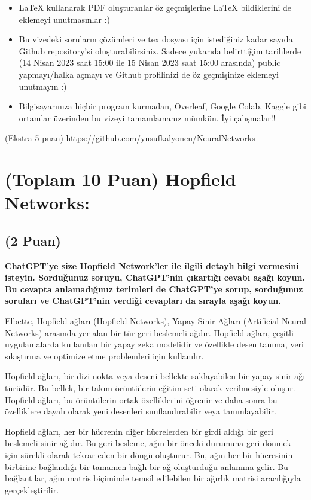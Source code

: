 \documentclass[11pt]{article}
\begin{document}
\begin{itemize}
    \item LaTeX kullanarak PDF oluşturanlar öz geçmişlerine LaTeX bildiklerini de eklemeyi unutmasınlar :)
    \item Bu vizedeki soruların çözümleri ve tex dosyası için istediğiniz kadar sayıda Github repository'si oluşturabilirsiniz. Sadece yukarıda belirttiğim tarihlerde (14 Nisan 2023 saat 15:00 ile 15 Nisan 2023 saat 15:00 arasında) public yapmayı/halka açmayı ve Github profilinizi de öz geçmişinize eklemeyi unutmayın :)
    \item Bilgisayarınıza hiçbir program kurmadan, Overleaf, Google Colab, Kaggle gibi ortamlar üzerinden bu vizeyi tamamlamanız mümkün. İyi çalışmalar!!
\end{itemize}

(Ekstra 5 puan) \url{https://github.com/yusufkalyoncu/NeuralNetworks}

\newpage
\section{(Toplam 10 Puan) Hopfield Networks:}

\subsection{(2 Puan)} \textbf{ChatGPT’ye size Hopfield Network’ler ile ilgili detaylı bilgi vermesini isteyin. Sorduğunuz soruyu, ChatGPT'nin çıkartığı cevabı aşağı koyun. Bu cevapta anlamadığınız terimleri de ChatGPT’ye sorup, sorduğunuz soruları ve ChatGPT’nin verdiği cevapları da sırayla aşağı koyun.}

Elbette, Hopfield ağları (Hopfield Networks), Yapay Sinir Ağları (Artificial Neural Networks) arasında yer alan bir tür geri beslemeli ağdır. Hopfield ağları, çeşitli uygulamalarda kullanılan bir yapay zeka modelidir ve özellikle desen tanıma, veri sıkıştırma ve optimize etme problemleri için kullanılır.

Hopfield ağları, bir dizi nokta veya deseni bellekte saklayabilen bir yapay sinir ağı türüdür. Bu bellek, bir takım örüntülerin eğitim seti olarak verilmesiyle oluşur. Hopfield ağları, bu örüntülerin ortak özelliklerini öğrenir ve daha sonra bu özelliklere dayalı olarak yeni desenleri sınıflandırabilir veya tanımlayabilir.

Hopfield ağları, her bir hücrenin diğer hücrelerden bir girdi aldığı bir geri beslemeli sinir ağıdır. Bu geri besleme, ağın bir önceki durumuna geri dönmek için sürekli olarak tekrar eden bir döngü oluşturur. Bu, ağın her bir hücresinin birbirine bağlandığı bir tamamen bağlı bir ağ oluşturduğu anlamına gelir. Bu bağlantılar, ağın matris biçiminde temsil edilebilen bir ağırlık matrisi aracılığıyla gerçekleştirilir.
\end{document}
